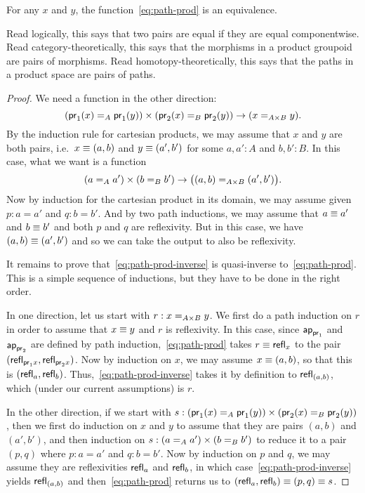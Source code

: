 \begin{thm}\label{thm:path-prod}
  For any $x$ and $y$, the function~\eqref{eq:path-prod} is an equivalence.
\end{thm}

Read logically, this says that two pairs are equal if they are equal
componentwise.  Read category-theoretically, this says that the
morphisms in a product groupoid are pairs of morphisms.  Read
homotopy-theoretically, this says that the paths in a product
space are pairs of paths.

\begin{proof}
  We need a function in the other direction:
  \begin{equation}
    (\id[A]{\proj1(x)}{\proj1(y)}) \times (\id[B]{\proj2(x)}{\proj2(y)}) \to (\id[A\times B]{x}{y}) .\label{eq:path-prod-inverse}
  \end{equation}
  By the induction rule for cartesian products, we may assume that $x$ and $y$ are both pairs, i.e.\ $x\jdeq (a,b)$ and $y\jdeq (a',b')$ for some $a,a':A$ and $b,b':B$.
  In this case, what we want is a function
  \begin{equation*}
    (\id[A]{a}{a'}) \times (\id[B]{b}{b'}) \to \big(\id[A\times B]{(a,b)}{(a',b')}\big).
  \end{equation*}
  Now by induction for the cartesian product in its domain, we may assume given $p:a=a'$ and $q:b=b'$.
  And by two path inductions, we may assume that $a\jdeq a'$ and $b\jdeq b'$ and both $p$ and $q$ are reflexivity.
  But in this case, we have $(a,b)\jdeq(a',b')$ and so we can take the output to also be reflexivity.

  It remains to prove that~\eqref{eq:path-prod-inverse} is quasi-inverse to~\eqref{eq:path-prod}.
  This is a simple sequence of inductions, but they have to be done in the right order.

  In one direction, let us start with $r:\id[A\times B]{x}{y}$.
  We first do a path induction on $r$ in order to assume that $x\jdeq y$ and $r$ is reflexivity.
  In this case, since $\apfunc{\proj1}$ and $\apfunc{\proj2}$ are defined by path induction,~\eqref{eq:path-prod} takes $r\jdeq \refl{x}$ to the pair $(\refl{\proj1x},\refl{\proj2x})$.
  Now by induction on $x$, we may assume $x\jdeq (a,b)$, so that this is $(\refl a, \refl b)$.
  Thus,~\eqref{eq:path-prod-inverse} takes it by definition to $\refl{(a,b)}$, which (under our current assumptions) is $r$.
  
  In the other direction, if we start with $s:(\id[A]{\proj1(x)}{\proj1(y)}) \times (\id[B]{\proj2(x)}{\proj2(y)})$, then we first do induction on $x$ and $y$ to assume that they are pairs $(a,b)$ and $(a',b')$, and then induction on $s:(\id[A]{a}{a'}) \times (\id[B]{b}{b'})$ to reduce it to a pair $(p,q)$ where $p:a=a'$ and $q:b=b'$.
  Now by induction on $p$ and $q$, we may assume they are reflexivities $\refl a$ and $\refl b$, in which case~\eqref{eq:path-prod-inverse} yields $\refl{(a,b)}$ and then~\eqref{eq:path-prod} returns us to $(\refl a,\refl b)\jdeq (p,q)\jdeq s$.
\end{proof}

